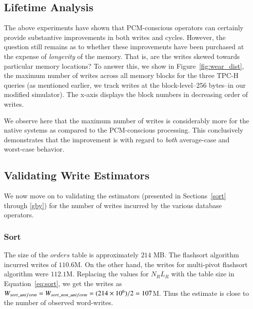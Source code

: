 \subsection{Lifetime Analysis}

The above experiments have shown that PCM-conscious operators
can certainly provide substantive improvements in both writes and
cycles. However, the question still remains as to whether these
improvements have been purchased at the expense of \emph{longevity} of
the memory. That is, are the writes skewed towards particular memory
locations?  To answer this, we show in Figure~\ref{fig:wear_dist}, the
maximum number of writes across all memory blocks for the three TPC-H queries
(as mentioned earlier,
we track writes at the block-level--256 bytes--in our modified simulator). The
x-axis displays the block numbers in 
decreasing order of writes. 

\begin{figure*}[htpb]
\centering

\hspace{0mm}

\hspace{0mm}

\caption{Queries wear distribution }
\label{fig:wear_dist}
\end{figure*}


We observe here that the maximum number of writes is considerably more for the
native systems as compared to the PCM-conscious processing. This
conclusively demonstrates that the improvement is with regard to
\emph{both} average-case and worst-case behavior.

\subsection{Validating Write Estimators}
\label{sec:validation}

We now move on to validating the estimators
(presented in Sections~\ref{sort} through \ref{gby})  for the number of
writes incurred by the various database operators.

\subsubsection{Sort}
The size of the $orders$ table is approximately $214$ MB. 
The flashsort algorithm incurred writes of $110.6$M. On the other hand,
the writes for multi-pivot flashsort algorithm were $112.1$M.
Replacing the values for $N_R L_R$ with the table size in Equation~\ref{eq:sort},
we get the writes as 
$W_{sort\_uniform} = W_{sort\_non\_uniform} = (214 \times 10^6)/2 = 107$M.
\noindent
Thus the estimate is close to the number of observed word-writes.




